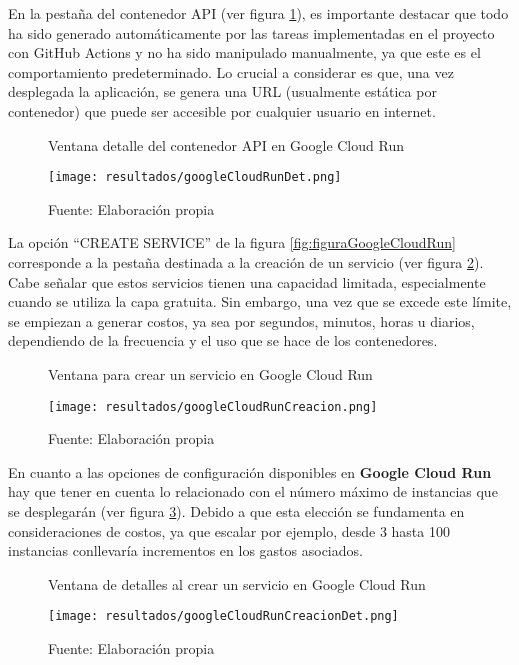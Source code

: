 En la pestaña del contenedor API (ver figura \ref{fig:figuraGoogleCloudRunDet}), es importante destacar que todo ha sido generado automáticamente por las tareas implementadas en el proyecto con GitHub Actions y no ha sido manipulado manualmente, ya que este es el comportamiento predeterminado. Lo crucial a considerar es que, una vez desplegada la aplicación, se genera una URL (usualmente estática por contenedor) que puede ser accesible por cualquier usuario en internet.

\newpage

\begin{figure}[h]
	\centering
	\caption{Ventana detalle del contenedor API en Google Cloud Run}
	\texttt{[image: resultados/googleCloudRunDet.png]}
	\caption*{\footnotesize Fuente: Elaboración propia}
	\label{fig:figuraGoogleCloudRunDet}
\end{figure}

La opción ``CREATE SERVICE'' de la figura \ref{fig:figuraGoogleCloudRun} corresponde a la pestaña destinada a la creación de un servicio (ver figura \ref{fig:figuraGoogleCloudRunCreacion}). Cabe señalar que estos servicios tienen una capacidad limitada, especialmente cuando se utiliza la capa gratuita. Sin embargo, una vez que se excede este límite, se empiezan a generar costos, ya sea por segundos, minutos, horas u diarios, dependiendo de la frecuencia y el uso que se hace de los contenedores.

\newpage

\begin{figure}[h]
	\centering
	\caption{Ventana para crear un servicio en Google Cloud Run}
	\texttt{[image: resultados/googleCloudRunCreacion.png]}
	\caption*{\footnotesize Fuente: Elaboración propia}
	\label{fig:figuraGoogleCloudRunCreacion}
\end{figure}

En cuanto a las opciones de configuración disponibles en \textbf{Google Cloud Run} hay que tener en cuenta lo relacionado con el número máximo de instancias que se desplegarán (ver figura \ref{fig:figuraGoogleCloudRunCreacionDet}). Debido a que esta elección se fundamenta en consideraciones de costos, ya que escalar por ejemplo, desde 3 hasta 100 instancias conllevaría incrementos en los gastos asociados.

\newpage

\begin{figure}[h]
	\centering
	\caption{Ventana de detalles al crear un servicio en Google Cloud Run}
	\texttt{[image: resultados/googleCloudRunCreacionDet.png]}
	\caption*{\footnotesize Fuente: Elaboración propia}
	\label{fig:figuraGoogleCloudRunCreacionDet}
\end{figure}


